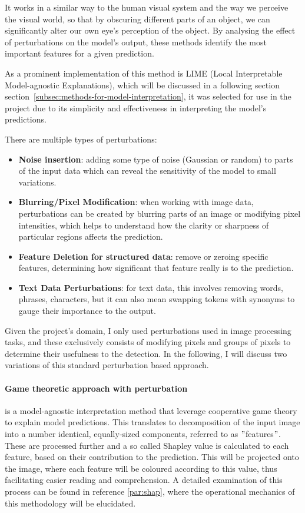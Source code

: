 It works in a similar way to the human visual system and the way we perceive the visual world,
so that by obscuring different parts of an object, we can significantly alter our own eye's perception of the object.
By analysing the effect of perturbations on the model's output, these methods identify the most important features for a given prediction.

As a prominent implementation of this method is LIME (Local Interpretable Model-agnostic Explanations), which will be discussed in a following section section~\ref{subsec:methods-for-model-interpretation}, it was selected
for use in the project due to its simplicity and effectiveness in interpreting the model's predictions.


There are multiple types of perturbations:
\begin{itemize}
    \item \textbf{Noise insertion}: adding some type of noise (Gaussian or random) to parts of the input data
    which can reveal the sensitivity of the model to small variations.
    \item \textbf{Blurring/Pixel Modification}: when working with image data, perturbations can be created by blurring parts of an image or modifying pixel intensities, which helps to understand how the clarity or sharpness of particular regions affects the prediction.
    \item \textbf{Feature Deletion for structured data}: remove or zeroing specific features, determining how significant that feature really is to the prediction.
    \item \textbf{Text Data Perturbations}: for text data, this involves removing words, phrases, characters, but it can also mean swapping tokens with synonyms to gauge their importance to the output.
\end{itemize}

Given the project's domain, I only used perturbations used in image processing tasks, and these exclusively consists of modifying pixels and groups of pixels to determine their usefulness to the detection.
In the following, I will discuss two variations of this standard perturbation based approach.

\paragraph{Game theoretic approach with perturbation}\label{par:game-theoretic-approach-with-pertubation}

 is a model-agnostic interpretation method that leverage cooperative game theory to explain model predictions.
This translates to decomposition of the input image into a number identical, equally-sized components, referred to as \("\)features\("\).
These are processed further and a so called Shapley value is calculated to each feature, based on their contribution to the prediction.
This will be projected onto the image, where each feature will be coloured according to this value, thus facilitating easier reading and comprehension.
A detailed examination of this process can be found in reference \ref{par:shap}, where the operational mechanics of this methodology will be elucidated.

